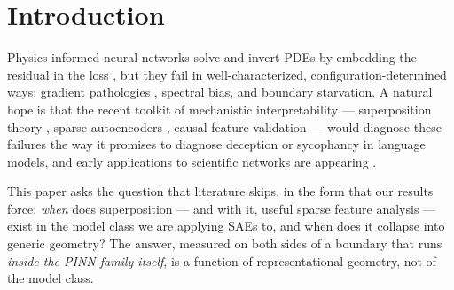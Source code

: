 \documentclass{article}
\begin{document}
\section{Introduction}
\label{sec:intro}

Physics-informed neural networks solve and invert PDEs by embedding the
residual in the loss \cite{raissi2019physics}, but they fail in
well-characterized, configuration-determined ways: gradient pathologies
\cite{wang2020understanding,krishnapriyan2021characterizing}, spectral bias,
and boundary starvation. A natural hope is that the recent toolkit of
mechanistic interpretability --- superposition theory
\cite{elbage2022toy}, sparse autoencoders
\cite{cunningham2023sparse,bricken2023towards,gao2025scaling}, causal feature
validation \cite{marks2025sparse,geiger2022inducing} --- would diagnose these
failures the way it promises to diagnose deception or sycophancy in language
models, and early applications to scientific networks are appearing
\cite{qi2026mechanistic}.

This paper asks the question that literature skips, in the form that our
results force:
\emph{when} does superposition --- and with it, useful sparse
feature analysis --- exist in the model class we are applying SAEs to,
and when does it collapse into generic geometry? The answer, measured on
both sides of a boundary that runs \emph{inside the PINN family itself},
is a function of representational geometry, not of the model class.
\end{document}
